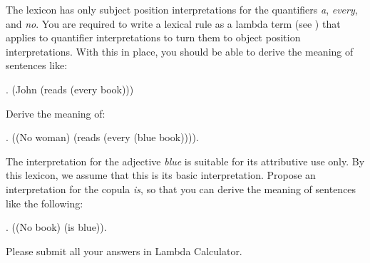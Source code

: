 \documentclass[10pt,a4paper]{exam}
\begin{document}
\begin{questions}
\question

The lexicon has only subject position interpretations for the
quantifiers \emph{a}, \emph{every}, and \emph{no}. You are required to
write a lexical rule as a lambda term (see ) that applies
to quantifier interpretations to turn them to object position
interpretations. With this in place, you should be able to derive the
meaning of sentences like:

\ex. (John (reads (every book)))



\question

Derive the meaning of:

\ex. ((No woman) (reads (every (blue book)))).



\question

The interpretation for the adjective \emph{blue} is suitable for its
attributive use only. By this lexicon, we assume that this is its
basic interpretation. Propose an interpretation for the copula
\emph{is}, so that you can derive the meaning of sentences like the
following:

\ex. ((No book) (is blue)).



\end{questions}


Please submit all your answers in Lambda Calculator.
\end{document}
